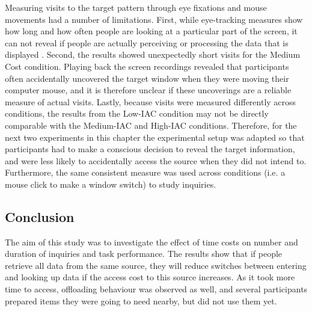 Measuring visits to the target pattern through eye fixations and mouse movements had a number of limitations.  
First, while eye-tracking measures show how long and how often people are looking at a particular part of the screen, it can not reveal if people are actually perceiving or processing the data that is displayed \citep{Waldron2007}. Second, the results showed unexpectedly short visits for the Medium Cost condition. Playing back the screen recordings revealed that participants often accidentally uncovered the target window when they were moving their computer mouse, and it is therefore unclear if these uncoverings are a reliable measure of actual visits. Lastly, because visits were measured differently across conditions, the results from the Low-IAC condition may not be directly comparable with the Medium-IAC and High-IAC conditions. Therefore, for the next two experiments in this chapter the experimental setup was adapted so that participants had to make a conscious decision to reveal the target information, and were less likely to accidentally access the source when they did not intend to. Furthermore, the same consistent measure was used across conditions (i.e. a mouse click to make a window switch) to study inquiries. 

 
 
 \subsection{Conclusion}
The aim of this study was to investigate the effect of time costs on number and duration of inquiries and task performance. The results show that if people retrieve all data from the same source, they will reduce switches between entering and looking up data if the access cost to this source increases. As it took more time to access, offloading behaviour was observed as well, and several participants prepared items they were going to need nearby, but did not use them yet. 

